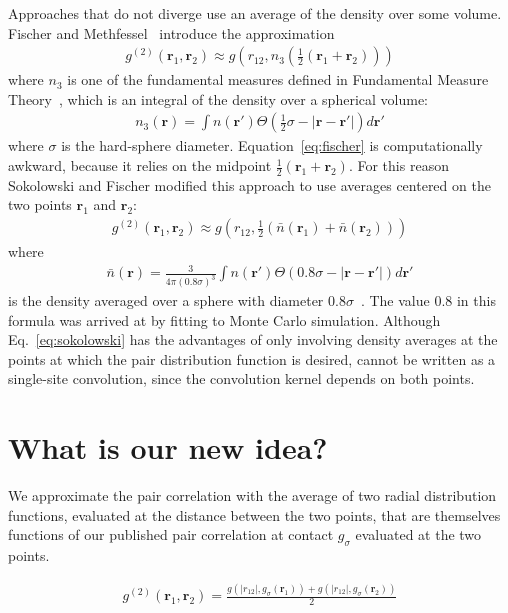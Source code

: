 \documentclass[letterpaper,twocolumn,amsmath,amssymb,pre]{revtex4-1}
\newcommand{\rr}{\textbf{r}}
\begin{document}
Approaches that do not diverge use an average of the density over some
volume. Fischer and Methfessel~\cite{fischer1980born} introduce the
approximation
\begin{align}
  g^{(2)}(\rr_1,\rr_2) \approx g\left(r_{12}, n_3\left(\tfrac12
  (\rr_1+\rr_2)\right)\right)
  \label{eq:fischer}
\end{align}
where $n_3$ is one of the fundamental measures defined in Fundamental
Measure Theory~\cite{rosenfeld1989free}, which is an integral of the
density over a spherical volume:
\begin{align}
  n_3(\rr) = \int n(\rr')\Theta(\tfrac12 \sigma - |\rr-\rr'|) d\rr'
\end{align}
where $\sigma$ is the hard-sphere diameter.  Equation~\ref{eq:fischer}
is computationally awkward, because it relies on the midpoint
$\tfrac12(\rr_1+\rr_2)$.  For this reason Sokolowski and Fischer
modified this approach to use averages centered on the two points
$\rr_1$ and $\rr_2$:
\begin{align}
  g^{(2)}(\rr_1,\rr_2) \approx g\left(r_{12},
  \tfrac12(\bar{n}(\rr_1)+\bar{n}(\rr_2))\right)
  \label{eq:sokolowski}
\end{align}
where
\begin{align}
  \bar{n}(\rr) = \frac{3}{4\pi (0.8\sigma)^3}\int n(\rr')\Theta(0.8\sigma - |\rr-\rr'|) d\rr'
\end{align}
is the density averaged over a sphere with diameter
$0.8\sigma$~\cite{sokolowski1992role}.  The value 0.8 in this formula
was arrived at by fitting to Monte Carlo simulation.  Although
Eq.~\ref{eq:sokolowski} has the advantages of only involving density
averages at the points at which the pair distribution function is
desired, cannot be written as a single-site convolution, since the
convolution kernel depends on both points.



\section{What is our new idea?}
We approximate the pair correlation with the average of two radial
distribution functions, evaluated at the distance between the two
points, that are themselves functions of our published pair
correlation at contact $g_{\sigma}$ evaluated at the two points.

\begin{align}
  g^{(2)}(\rr_1,\rr_2) = \frac{g(|r_{12}|, g_\sigma(\rr_1)) + g(|r_{12}|, g_\sigma(\rr_2))}{2}
\end{align}
\end{document}
